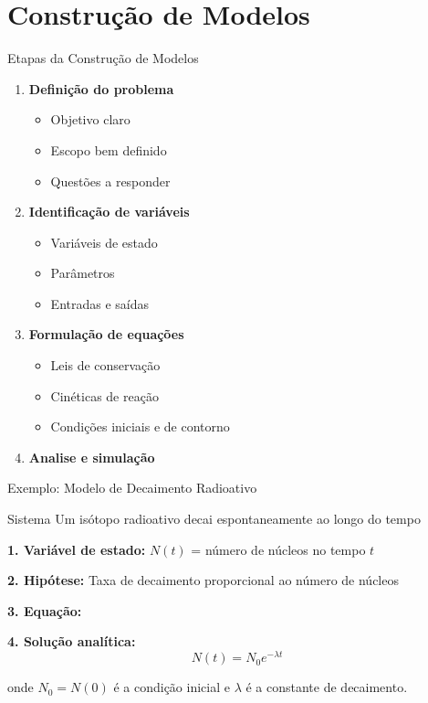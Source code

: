 \section{Construção de Modelos}

\begin{frame}{Etapas da Construção de Modelos}
\begin{enumerate}
    \item \textbf{Definição do problema}
    \begin{itemize}
        \item Objetivo claro
        \item Escopo bem definido
        \item Questões a responder
    \end{itemize}

    \item \textbf{Identificação de variáveis}
    \begin{itemize}
        \item Variáveis de estado
        \item Parâmetros
        \item Entradas e saídas
    \end{itemize}

    \item \textbf{Formulação de equações}
    \begin{itemize}
        \item Leis de conservação
        \item Cinéticas de reação
        \item Condições iniciais e de contorno
    \end{itemize}

    \item \textbf{Analise e simulação}
\end{enumerate}
\end{frame}

\begin{frame}{Exemplo: Modelo de Decaimento Radioativo}
\begin{block}{Sistema}
Um isótopo radioativo decai espontaneamente ao longo do tempo
\end{block}

\textbf{1. Variável de estado:} $N(t)$ = número de núcleos no tempo $t$

\textbf{2. Hipótese:} Taxa de decaimento proporcional ao número de núcleos

\textbf{3. Equação:}

\textbf{4. Solução analítica:}
\begin{equation*}
N(t) = N_0 e^{-\lambda t}
\end{equation*}

onde $N_0 = N(0)$ é a condição inicial e $\lambda$ é a constante de decaimento.
\end{frame}

